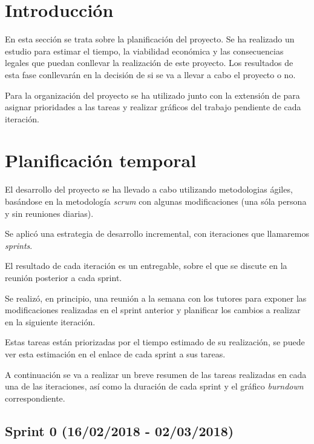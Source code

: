 
\section{Introducción}

En esta sección se trata sobre la planificación del proyecto. Se ha realizado un estudio para estimar el tiempo, la viabilidad económica y las consecuencias legales que puedan conllevar la realización de este proyecto. Los resultados de esta fase conllevarán en la decisión de si se va a llevar a cabo el proyecto o no.

Para la organización del proyecto se ha utilizado  junto con la extensión de  para asignar prioridades a las tareas y realizar gráficos del trabajo pendiente de cada iteración.

\section{Planificación temporal}

El desarrollo del proyecto se ha llevado a cabo utilizando metodologias ágiles, basándose en la metodología \textit{scrum} con algunas modificaciones (una sóla persona y sin reuniones diarias).

Se aplicó una estrategia de desarrollo incremental, con iteraciones que llamaremos \textit{sprints}.

El resultado de cada iteración es un entregable, sobre el que se discute en la reunión posterior a cada sprint.

Se realizó, en principio, una reunión a la semana con los tutores para exponer las modificaciones realizadas en el sprint anterior y planificar los cambios a realizar en la siguiente iteración. 

Estas tareas están priorizadas por el tiempo estimado de su realización, se puede ver esta estimación en el enlace de cada sprint a sus tareas. 

A continuación se va a realizar un breve resumen de las tareas realizadas en cada una de las iteraciones, así como la duración de cada sprint y el gráfico \textit{burndown} correspondiente.

\subsection{Sprint 0 (16/02/2018 - 02/03/2018)}

